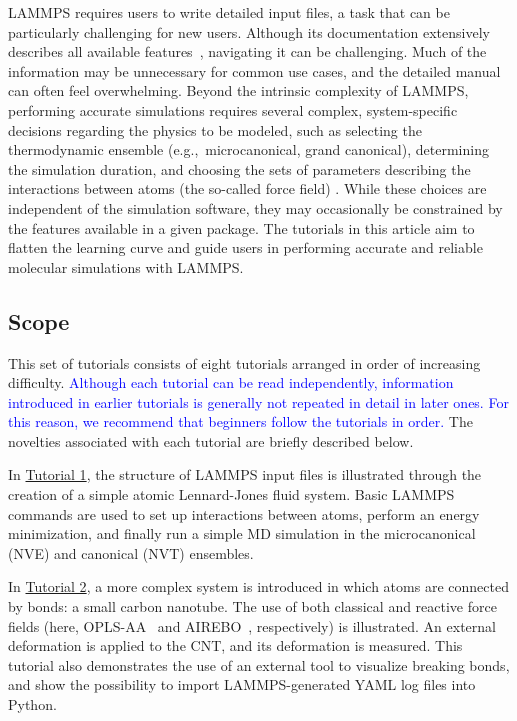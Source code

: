 \documentclass[9pt,tutorial]{livecoms}
\begin{document}
LAMMPS requires users to write detailed input files, a task that can be
particularly challenging for new users.  Although its documentation
extensively describes all available features~\cite{lammps_docs},
navigating it can be challenging.  Much of the information may be
unnecessary for common use cases, and the detailed manual can often feel
overwhelming.  Beyond the intrinsic complexity of LAMMPS, performing
accurate simulations requires several complex, system-specific decisions
regarding the physics to be modeled, such as selecting the thermodynamic
ensemble (e.g.,~microcanonical, grand canonical), determining the
simulation duration, and choosing the sets of parameters describing the
interactions between atoms (the so-called force field)
\cite{wong2016good, van2018validation, prasad2018best}.  While these
choices are independent of the simulation software, they may
occasionally be constrained by the features available in a given
package.  The tutorials in this article aim to flatten the learning
curve and guide users in performing accurate and reliable molecular
simulations with LAMMPS.

\subsection{Scope}

This set of tutorials consists of eight tutorials arranged in order of
increasing difficulty.  \textcolor{blue}{Although each tutorial can be 
read independently, information introduced in earlier tutorials is 
generally not repeated in detail in later ones. For this reason, we 
recommend that beginners follow the tutorials in order.}  The novelties
associated with each tutorial are briefly described below.

In \hyperref[lennard-jones-label]{Tutorial 1}, the structure of LAMMPS
input files is illustrated through the creation of a simple atomic
Lennard-Jones fluid system.  Basic LAMMPS commands are used to set up
interactions between atoms, perform an energy minimization, and finally
run a simple MD simulation in the microcanonical (NVE) and canonical (NVT)
ensembles.

In \hyperref[carbon-nanotube-label]{Tutorial 2}, a more complex system
is introduced in which atoms are connected by bonds: a small carbon
nanotube.  The use of both classical and reactive force fields (here,
OPLS-AA~\cite{jorgensenDevelopmentTestingOPLS1996} and
AIREBO~\cite{stuart2000reactive}, respectively) is illustrated.  An
external deformation is applied to the CNT, and its deformation is
measured.  This tutorial also demonstrates the use of an external tool
to visualize breaking bonds, and show the possibility to import
LAMMPS-generated YAML log files into Python.
\end{document}
